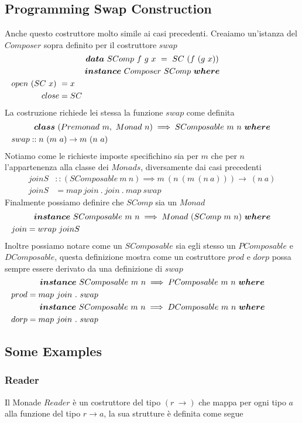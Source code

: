 \subsection{Programming Swap Construction}
\label{programming_swap_construction}
Anche questo costruttore molto simile ai casi precedenti.
Creaiamo un'istanza del $Composer$ sopra definito per il costruttore $swap$
\begin{align*}
  \classdef{\bm{data}\ SComp\ f\ g\ x\ =\ SC\ (f\ (g\ x))}
  \classdef{\bm{instance}\ Composer\ SComp\ \bm{where} }
  open\ (SC\ x)\ &= x\\
  close &= SC
\end{align*}
La costruzione richiede lei stessa la funzione $swap$ come definita
\begin{align*}
  \classdef{\bm{class}\ (Premonad\ m,\ Monad\ n) \implies SComposable\ m\ n\ \bm{where}}
  swap &:: n\ (m\ a) \to m\ (n\ a)
\end{align*}
Notiamo come le richieste imposte specifichino sia per $m$ che per $n$ l'appartenenza
alla classe dei $Monads$, diversamente dai casi precedenti
\begin{align*}
  joinS &:: (SComposable\ m\ n) \implies m\ (n\ (m\ (n\ a))) \to \ (n\ a)\\
  joinS &= map\ join\ .\ join\ .\ map\ swap
\end{align*}
Finalmente possiamo definire che $SComp$ sia un $Monad$
\begin{align*}
  \classdef{\bm{instance}\ SComposable\ m\ n \implies Monad\ (SComp\ m\ n)\ \bm{where}}
  join &= wrap\ joinS
\end{align*}
Inoltre possiamo notare come un $SComposable$ sia egli stesso un $PComposable$ e
$DComposable$, questa definizione mostra come un costruttore $prod$ e $dorp$
possa sempre essere derivato da una definizione di $swap$
\begin{align*}
  \classdef{\bm{instance}\ SComposable\ m\ n \implies PComposable\ m\ n\ \bm{where}}
  prod &= map\ join\ .\ swap\\
  \classdef{\bm{instance}\ SComposable\ m\ n \implies DComposable\ m\ n\ \bm{where}}
  dorp &= map\ join\ .\ swap\\
\end{align*}

\subsection{Some Examples}
\label{some_examples}

\subsubsection*{Reader}
Il Monade $Reader$ è un costruttore del tipo $(r\ \to)$ che mappa per ogni tipo
$a$ alla funzione del tipo $r \to a$, la sua strutture  è definita come segue

